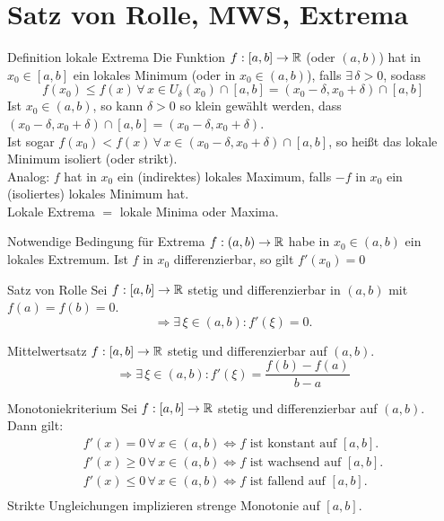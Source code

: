 \documentclass[main.tex]{subfiles}
\begin{document}
\section*{Satz von Rolle, MWS, Extrema}
\begin{karte}{Definition lokale Extrema}
    Die Funktion \( f : [a,b] \rightarrow \mathbb{R} \) (oder \( (a,b) \))
    hat in \( x_0 \in [a,b] \) ein lokales Minimum (oder in 
    \( x_0 \in (a,b) \)), falls \( \exists \, \delta > 0 \), 
    sodass 
    \[ f(x_0) \leq f(x) \, \forall \, x \in U_\delta(x_0)
    \cap [a,b] = (x_0 - \delta, x_0 + \delta) \cap [a,b] \]
    Ist \( x_0 \in (a,b) \), so kann \( \delta > 0 \) so klein 
    gewählt werden, dass \( (x_0 - \delta, x_0 + \delta) 
    \cap [a,b] = (x_0 - \delta, x_0 + \delta) \). \\
    Ist sogar \( f(x_0) < f(x) \,\forall \, x \in 
    (x_0 - \delta, x_0 + \delta) \cap [a,b] \), so heißt 
    das lokale Minimum isoliert (oder strikt).\\
    Analog: \( f \) hat in \( x_0 \) ein (indirektes) lokales 
    Maximum, falls \(-f\) in \(x_0\) ein (isoliertes) lokales 
    Minimum hat.\\
    Lokale Extrema \(=\) lokale Minima oder Maxima.
\end{karte}
\begin{karte}{Notwendige Bedingung für Extrema}
    \( f: (a,b) \rightarrow \mathbb{R} \) habe in \(x_0 \in (a,b) \) 
    ein lokales Extremum. Ist \(f\) in \(x_0\) differenzierbar, 
    so gilt \( f'(x_0) = 0 \)
\end{karte}
\begin{karte}{Satz von Rolle}
    Sei \( f: [a,b] \rightarrow \mathbb{R} \) stetig und differenzierbar 
    in \( (a,b) \) mit \( f(a) = f(b) = 0 \).
    \[ \Rightarrow \exists \, \xi \in (a,b) : f'(\xi) = 0. \]
\end{karte}
\begin{karte}{Mittelwertsatz}
    \( f: [a, b] \rightarrow \mathbb{R} \) stetig und differenzierbar 
    auf \((a,b)\).
    \[ \Rightarrow \exists \, \xi \in (a,b): f'(\xi) = \frac{f(b)-f(a)}{b-a} \]
\end{karte}
\begin{karte}{Monotoniekriterium}
    Sei \( f : [a,b] \rightarrow \mathbb{R} \) stetig und differenzierbar 
    auf \( (a,b) \).\\
    Dann gilt:
    \begin{align*}
        f'(x) = 0 \,\forall \, x \in (a,b) \Leftrightarrow 
        f \text{ ist konstant auf } [a,b].\\
        f'(x) \geq 0 \,\forall \, x \in (a,b) \Leftrightarrow 
        f \text{ ist wachsend auf } [a,b].\\ 
        f'(x) \leq 0 \,\forall \, x \in (a,b) \Leftrightarrow 
        f \text{ ist fallend auf } [a,b].\\
    \end{align*}
    Strikte Ungleichungen implizieren strenge Monotonie auf 
    \( [a,b] \).
\end{karte}
\end{document}
